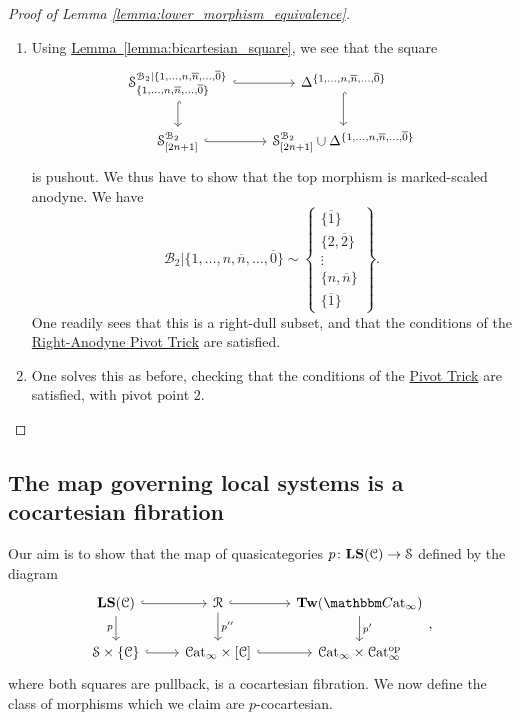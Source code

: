 \documentclass[main.tex]{subfiles}
\begin{document}
\begin{proof}[Proof of Lemma \ref{lemma:lower_morphism_equivalence}]
\begin{enumerate}
    \item Using \hyperref[lemma:bicartesian_square]{Lemma~\ref*{lemma:bicartesian_square}}, we see that the square
      \begin{equation*}
        \begin{tikzcd}
          \S^{\mathcal{B}_{2}|\{1, \ldots, n, \overline{n}, \ldots, \overline{0}\}}_{\{1, \ldots, n, \overline{n}, \ldots, \overline{0}\}}
          \arrow[r, hook]
          \arrow[d, hook]
          & \Delta^{\{1, \ldots, n, \overline{n}, \ldots, \overline{0}\}}
          \arrow[d, hook]
          \\
          \S^{\mathcal{B}_{2}}_{[2n+1]}
          \arrow[r, hook]
          & \S^{\mathcal{B}_{2}}_{[2n+1]} \cup \Delta^{\{1, \ldots, n, \overline{n}, \ldots, \overline{0}\}}
        \end{tikzcd}
      \end{equation*}
      is pushout. We thus have to show that the top morphism is marked-scaled anodyne. We have
      \begin{equation*}
        \mathcal{B}_{2}|\{1, \ldots, n, \overline{n}, \ldots, \overline{0}\} \sim
        \left\{ \substack{ \{\overline{1}\} \\ \{2, \overline{2}\} \\ \vdots \\ \{n, \overline{n}\} \\ \{\overline{1}\} } \right\}.
      \end{equation*}
      One readily sees that this is a right-dull subset, and that the conditions of the \hyperref[lemma:right-anodyne_pivot_trick]{Right-Anodyne Pivot Trick} are satisfied.

    \item One solves this as before, checking that the conditions of the \hyperref[lemma:pivot_trick]{Pivot Trick} are satisfied, with pivot point $2$.
  \end{enumerate}
\end{proof}

\subsection{The map governing local systems is a cocartesian fibration}
\label{ssc:the_fibration}

Our aim is to show that the map of quasicategories $p\colon \mathbf{LS}(\mathcal{C}) \to \mathcal{S}$ defined by the diagram
\begin{equation*}
  \begin{tikzcd}
    \LS(\category{C})
    \arrow[r, hook]
    \arrow[d, swap, "p"]
    & \mathcal{R}
    \arrow[r, hook]
    \arrow[d, "p''"]
    & \Tw(\ICCat)
    \arrow[d, "p'"]
    \\
    \S \times \{\category{C}\}
    \arrow[r, hook]
    & \ICat \times [\category{C}]
    \arrow[r, hook]
    & \ICat \times \ICat\op
  \end{tikzcd},
\end{equation*}
where both squares are pullback, is a cocartesian fibration. We now define the class of morphisms which we claim are $p$-cocartesian.
\end{document}
